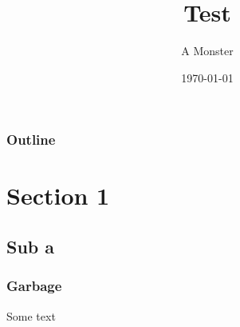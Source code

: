 \documentclass[xcolor=dvipsnames]{beamer}
\title{Test}
\author{A Monster}
\institute{In A Cave}
\date{\today}
\begin{document}
\begin{frame}
\titlepage
\end{frame}

\begin{frame}
\frametitle{Outline}
\tableofcontents
\end{frame}

\section{Section 1}
\subsection{Sub a}

\begin{frame}
\frametitle{Garbage}
Some text
\end{frame}
\end{document}
